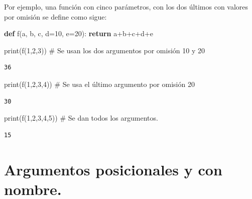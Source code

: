 \documentclass[
  spanish,
  letterpaper,
]{scrbook}
\newenvironment{Shaded}{\begin{snugshade}}{\end{snugshade}}
\newcommand{\BuiltInTok}[1]{\textcolor[rgb]{0.00,0.23,0.31}{#1}}
\newcommand{\CommentTok}[1]{\textcolor[rgb]{0.37,0.37,0.37}{#1}}
\newcommand{\ControlFlowTok}[1]{\textcolor[rgb]{0.00,0.23,0.31}{\textbf{#1}}}
\newcommand{\DecValTok}[1]{\textcolor[rgb]{0.68,0.00,0.00}{#1}}
\newcommand{\KeywordTok}[1]{\textcolor[rgb]{0.00,0.23,0.31}{\textbf{#1}}}
\newcommand{\NormalTok}[1]{\textcolor[rgb]{0.00,0.23,0.31}{#1}}
\newcommand{\OperatorTok}[1]{\textcolor[rgb]{0.37,0.37,0.37}{#1}}
\theoremstyle{definition}
\theoremstyle{remark}
\begin{document}
Por ejemplo, una función con cinco parámetros, con los dos últimos con
valores por omisión se define como sigue:

\begin{Shaded}
\begin{Highlighting}[]
\KeywordTok{def}\NormalTok{ f(a, b, c, d}\OperatorTok{=}\DecValTok{10}\NormalTok{, e}\OperatorTok{=}\DecValTok{20}\NormalTok{):}
    \ControlFlowTok{return}\NormalTok{ a}\OperatorTok{+}\NormalTok{b}\OperatorTok{+}\NormalTok{c}\OperatorTok{+}\NormalTok{d}\OperatorTok{+}\NormalTok{e}
\end{Highlighting}
\end{Shaded}

\begin{Shaded}
\begin{Highlighting}[]
\BuiltInTok{print}\NormalTok{(f(}\DecValTok{1}\NormalTok{,}\DecValTok{2}\NormalTok{,}\DecValTok{3}\NormalTok{))  }\CommentTok{\# Se usan los dos argumentos por omisión 10 y 20}
\end{Highlighting}
\end{Shaded}

\begin{verbatim}
36
\end{verbatim}

\begin{Shaded}
\begin{Highlighting}[]
\BuiltInTok{print}\NormalTok{(f(}\DecValTok{1}\NormalTok{,}\DecValTok{2}\NormalTok{,}\DecValTok{3}\NormalTok{,}\DecValTok{4}\NormalTok{)) }\CommentTok{\# Se usa el último argumento por omisión 20}
\end{Highlighting}
\end{Shaded}

\begin{verbatim}
30
\end{verbatim}

\begin{Shaded}
\begin{Highlighting}[]
\BuiltInTok{print}\NormalTok{(f(}\DecValTok{1}\NormalTok{,}\DecValTok{2}\NormalTok{,}\DecValTok{3}\NormalTok{,}\DecValTok{4}\NormalTok{,}\DecValTok{5}\NormalTok{)) }\CommentTok{\# Se dan todos los argumentos.}
\end{Highlighting}
\end{Shaded}

\begin{verbatim}
15
\end{verbatim}

\section{Argumentos posicionales y con
nombre.}\label{argumentos-posicionales-y-con-nombre.}
\end{document}
